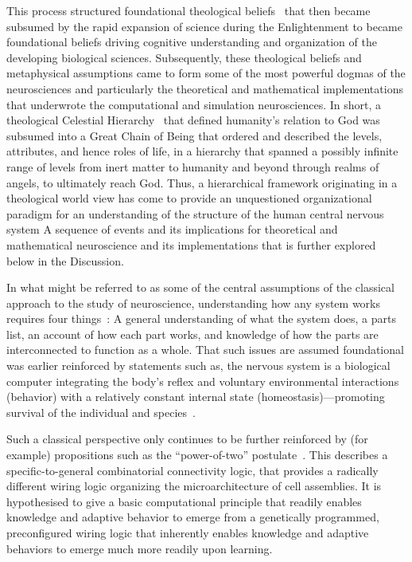 \documentclass[11pt,3p,twocolumn]{JMN}
\begin{document}
This process structured foundational theological beliefs~\citep{lovejoy48} that then became subsumed by the rapid expansion of science during the Enlightenment to became foundational beliefs driving cognitive understanding and organization of the developing biological sciences. Subsequently, these theological beliefs and metaphysical assumptions came to form some of the most powerful dogmas of the neurosciences and particularly the theoretical and mathematical implementations that underwrote the computational and simulation neurosciences. In short, a theological Celestial Hierarchy~\citep{parker99} that defined humanity's relation to God was subsumed into a Great Chain of Being that ordered and described the levels, attributes, and hence roles of life, in a hierarchy that spanned a possibly infinite range of levels from inert matter to humanity and beyond through realms of angels, to ultimately reach God. Thus, a hierarchical framework originating in a theological world view has come to provide an unquestioned organizational paradigm for an understanding of the structure of the human central nervous system A sequence of events and its implications for theoretical and mathematical neuroscience and its implementations that is further explored below in the Discussion.

In what might be referred to as some of the central assumptions of the classical approach to the study of neuroscience, understanding how any system works requires four things~\citep{swanson15}: A general understanding of what the system does, a parts list, an account of how each part works, and knowledge of how the parts are interconnected to function as a whole. That such issues are assumed foundational was earlier reinforced by statements such as, the nervous system is a biological computer integrating the body’s reflex and voluntary environmental interactions (behavior) with a relatively constant internal state (homeostasis)—promoting survival of the individual and species~\citep{swanson10}.

Such a classical perspective only continues to be further reinforced by (for example) propositions such as the ``power-of-two'' postulate~\citep{tsien15}. This describes a specific-to-general combinatorial connectivity logic, that provides a radically different wiring logic organizing the microarchitecture of cell assemblies. It is hypothesised to give a basic computational principle that readily enables knowledge and adaptive behavior to emerge from a genetically programmed, preconfigured wiring logic that inherently enables knowledge and adaptive behaviors to emerge much more readily upon learning.
\end{document}
